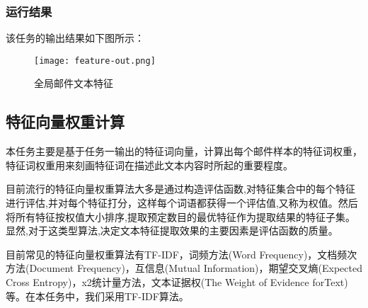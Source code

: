 \documentclass[lang=cn,11pt]{elegantpaper}
\begin{document}
\subsubsection{运行结果}
该任务的输出结果如下图所示：
\begin{figure}[!htbp]
	\centering
	\texttt{[image: feature-out.png]}
	\caption{全局邮件文本特征 \label{fig:feature-out}}
\end{figure}

\subsection{特征向量权重计算}
本任务主要是基于任务一输出的特征词向量，计算出每个邮件样本的特征词权重，特征词权重用来刻画特征词在描述此文本内容时所起的重要程度。\par
目前流行的特征向量权重算法大多是通过构造评估函数,对特征集合中的每个特征进行评估,并对每个特征打分，这样每个词语都获得一个评估值,又称为权值。然后将所有特征按权值大小排序,提取预定数目的最优特征作为提取结果的特征子集。显然,对于这类型算法,决定文本特征提取效果的主要因素是评估函数的质量。\par
目前常见的特征向量权重算法有TF-IDF，词频方法(Word Frequency)，文档频次方法(Document Frequency)，互信息(Mutual Information)，期望交叉熵(Expected Cross Entropy)，x2统计量方法，文本证据权(The Weight of Evidence forText)等。在本任务中，我们采用TF-IDF算法。
\end{document}
